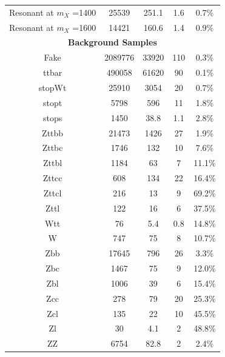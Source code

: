 \begin{table}
\begin{tabular}{|c|c|c|c|c|}
Resonant at $m_X$ =1400	& 25539 &251.1 &  1.6& 0.7\% \\
Resonant at $m_X$ =1600	& 14421 &160.6 &  1.4& 0.9\% \\
\hline
\multicolumn{5}{|c|}{\textbf{Background Samples}} \\
\hline
Fake    &         2089776         &33920        &110           &       0.3\%      \\
ttbar     &         490058          &61620        &90           &       0.1\%      \\
stopWt    &         25910         &3054        &20           &       0.7\%      \\
stopt     &         5798          &596        &11           &       1.8\%      \\
stops     &         1450          &38.8        &1.1           &       2.8\%      \\
Zttbb     &         21473         &1426        &27           &       1.9\%      \\
Zttbc     &         1746          &132        &10           &       7.6\%      \\
Zttbl     &         1184          &63        &7           &       11.1\%      \\
Zttcc     &         608         &134        &22           &       16.4\%      \\
Zttcl     &         216         &13        &9           &       69.2\%      \\
Zttl    &         122         &16        &6           &       37.5\%      \\
Wtt     &         76          &5.4        &0.8           &       14.8\%      \\
W     &         747         &75        &8           &       10.7\%      \\
Zbb     &         17645         &796        &26           &       3.3\%      \\
Zbc     &         1467          &75        &9           &       12.0\%      \\
Zbl     &         1006          &39        &6           &       15.4\%      \\
Zcc     &         278         &79        &20           &       25.3\%      \\
Zcl     &         135         &22        &10           &       45.5\%      \\
Zl    &         30          &4.1        &2           &       48.8\%      \\
ZZ    &         6754          &82.8        &2           &       2.4\%      \\

\end{tabular}
\end{table}
